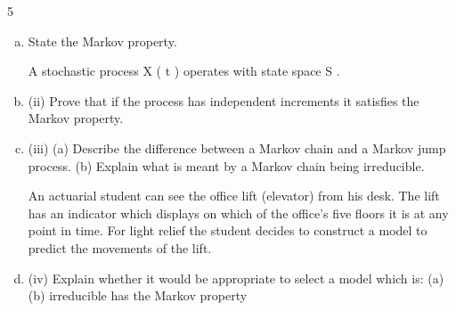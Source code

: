 \documentclass[a4paper,12pt]{article}
\begin{document}
5
\begin{enumerate}[(a)]
\item State the Markov property.

A stochastic process X ( t ) operates with state space S .
\item (ii) Prove that if the process has independent increments it satisfies the Markov
property.

\item (iii) (a)
Describe the difference between a Markov chain and a Markov jump
process.
(b)
Explain what is meant by a Markov chain being irreducible.

An actuarial student can see the office lift (elevator) from his desk. The lift has an
indicator which displays on which of the office’s five floors it is at any point in time.
For light relief the student decides to construct a model to predict the movements of
the lift.
\item (iv)
Explain whether it would be appropriate to select a model which is:
(a)
(b)
irreducible
has the Markov property
\end{enumerate}
\end{document}
